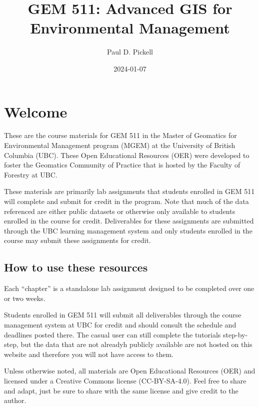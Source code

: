 \documentclass[
]{book}
\title{GEM 511: Advanced GIS for Environmental Management}
\author{Paul D. Pickell}
\date{2024-01-07}
\begin{document}
\maketitle

{
\setcounter{tocdepth}{1}
\tableofcontents
}
\hypertarget{welcome}{%
\chapter*{Welcome}\label{welcome}}

These are the course materials for GEM 511 in the Master of Geomatics for Environmental Management program (MGEM) at the University of British Columbia (UBC). These Open Educational Resources (OER) were developed to foster the Geomatics Community of Practice that is hosted by the Faculty of Forestry at UBC.

These materials are primarily lab assignments that students enrolled in GEM 511 will complete and submit for credit in the program. Note that much of the data referenced are either public datasets or otherwise only available to students enrolled in the course for credit. Deliverables for these assignments are submitted through the UBC learning management system and only students enrolled in the course may submit these assignments for credit.

\hypertarget{how-to-use-these-resources}{%
\section*{How to use these resources}\label{how-to-use-these-resources}}

Each ``chapter'' is a standalone lab assignment designed to be completed over one or two weeks.

Students enrolled in GEM 511 will submit all deliverables through the course management system at UBC for credit and should consult the schedule and deadlines posted there. The casual user can still complete the tutorials step-by-step, but the data that are not alreadyh publicly available are not hosted on this website and therefore you will not have access to them.

Unless otherwise noted, all materials are Open Educational Resources (OER) and licensed under a Creative Commons license (CC-BY-SA-4.0). Feel free to share and adapt, just be sure to share with the same license and give credit to the author.
\end{document}
